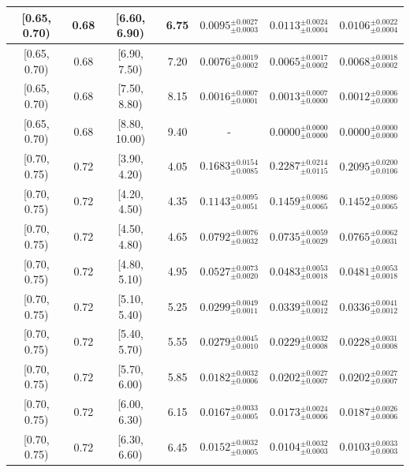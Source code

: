 \begin{longtable}{|c|c|c|c|c|c|c|}
\hline
[0.65, 0.70) & 0.68 & [6.60, 6.90) & 6.75 & $0.0095^{ \pm 0.0027 }_{ \pm 0.0003 }$ & $0.0113^{ \pm 0.0024 }_{ \pm 0.0004 }$ & $0.0106^{ \pm 0.0022 }_{ \pm 0.0004 }$ \\ 
\hline
[0.65, 0.70) & 0.68 & [6.90, 7.50) & 7.20 & $0.0076^{ \pm 0.0019 }_{ \pm 0.0002 }$ & $0.0065^{ \pm 0.0017 }_{ \pm 0.0002 }$ & $0.0068^{ \pm 0.0018 }_{ \pm 0.0002 }$ \\ 
\hline
[0.65, 0.70) & 0.68 & [7.50, 8.80) & 8.15 & $0.0016^{ \pm 0.0007 }_{ \pm 0.0001 }$ & $0.0013^{ \pm 0.0007 }_{ \pm 0.0000 }$ & $0.0012^{ \pm 0.0006 }_{ \pm 0.0000 }$ \\ 
\hline
[0.65, 0.70) & 0.68 & [8.80, 10.00) & 9.40 & - & $0.0000^{ \pm 0.0000 }_{ \pm 0.0000 }$ & $0.0000^{ \pm 0.0000 }_{ \pm 0.0000 }$ \\ 
\hline
[0.70, 0.75) & 0.72 & [3.90, 4.20) & 4.05 & $0.1683^{ \pm 0.0154 }_{ \pm 0.0085 }$ & $0.2287^{ \pm 0.0214 }_{ \pm 0.0115 }$ & $0.2095^{ \pm 0.0200 }_{ \pm 0.0106 }$ \\ 
\hline
[0.70, 0.75) & 0.72 & [4.20, 4.50) & 4.35 & $0.1143^{ \pm 0.0095 }_{ \pm 0.0051 }$ & $0.1459^{ \pm 0.0086 }_{ \pm 0.0065 }$ & $0.1452^{ \pm 0.0086 }_{ \pm 0.0065 }$ \\ 
\hline
[0.70, 0.75) & 0.72 & [4.50, 4.80) & 4.65 & $0.0792^{ \pm 0.0076 }_{ \pm 0.0032 }$ & $0.0735^{ \pm 0.0059 }_{ \pm 0.0029 }$ & $0.0765^{ \pm 0.0062 }_{ \pm 0.0031 }$ \\ 
\hline
[0.70, 0.75) & 0.72 & [4.80, 5.10) & 4.95 & $0.0527^{ \pm 0.0073 }_{ \pm 0.0020 }$ & $0.0483^{ \pm 0.0053 }_{ \pm 0.0018 }$ & $0.0481^{ \pm 0.0053 }_{ \pm 0.0018 }$ \\ 
\hline
[0.70, 0.75) & 0.72 & [5.10, 5.40) & 5.25 & $0.0299^{ \pm 0.0049 }_{ \pm 0.0011 }$ & $0.0339^{ \pm 0.0042 }_{ \pm 0.0012 }$ & $0.0336^{ \pm 0.0041 }_{ \pm 0.0012 }$ \\ 
\hline
[0.70, 0.75) & 0.72 & [5.40, 5.70) & 5.55 & $0.0279^{ \pm 0.0045 }_{ \pm 0.0010 }$ & $0.0229^{ \pm 0.0032 }_{ \pm 0.0008 }$ & $0.0228^{ \pm 0.0031 }_{ \pm 0.0008 }$ \\ 
\hline
[0.70, 0.75) & 0.72 & [5.70, 6.00) & 5.85 & $0.0182^{ \pm 0.0032 }_{ \pm 0.0006 }$ & $0.0202^{ \pm 0.0027 }_{ \pm 0.0007 }$ & $0.0202^{ \pm 0.0027 }_{ \pm 0.0007 }$ \\ 
\hline
[0.70, 0.75) & 0.72 & [6.00, 6.30) & 6.15 & $0.0167^{ \pm 0.0033 }_{ \pm 0.0005 }$ & $0.0173^{ \pm 0.0024 }_{ \pm 0.0006 }$ & $0.0187^{ \pm 0.0026 }_{ \pm 0.0006 }$ \\ 
\hline
[0.70, 0.75) & 0.72 & [6.30, 6.60) & 6.45 & $0.0152^{ \pm 0.0032 }_{ \pm 0.0005 }$ & $0.0104^{ \pm 0.0032 }_{ \pm 0.0003 }$ & $0.0103^{ \pm 0.0033 }_{ \pm 0.0003 }$ \\ 

\end{longtable}
